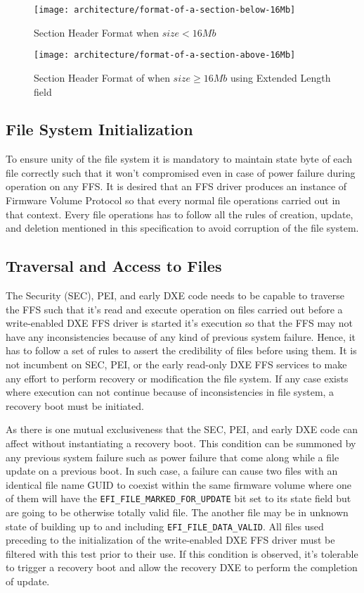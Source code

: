 \begin{figure}[!htbp]
	\centering
	\texttt{[image: architecture/format-of-a-section-below-16Mb]}
	\caption{Section Header Format when $ size < 16Mb $}\label{fig:architecture-format-of-a-section-below-16Mb}
\end{figure}

\begin{figure}[!htbp]
	\centering
	\texttt{[image: architecture/format-of-a-section-above-16Mb]}
	\caption{Section Header Format of when $ size \geq 16Mb $  using Extended Length field}\label{fig:architecture-format-of-a-section-above-16Mb}
\end{figure}


\subsection{File System Initialization}\label{subsection:file-system-initialization}
To ensure unity of the file system it is mandatory to maintain state byte of each file correctly such that it won't compromised even in case of power failure during operation on any FFS. It is desired that an FFS driver produces an instance of Firmware Volume Protocol so that every normal file operations carried out in that context. Every file operations has to follow all the rules of creation, update, and deletion mentioned in this specification to avoid corruption of the file system.

\subsection{Traversal and Access to Files}
The Security (SEC), PEI, and early DXE code needs to be capable to traverse the FFS such that it's read and execute operation on files carried out before a write-enabled DXE FFS driver is started it's execution so that the FFS may not have any inconsistencies because of any kind of previous system failure. Hence, it has to follow a set of rules to assert the credibility of files before using them. It is not incumbent on SEC, PEI, or the early read-only DXE FFS services to make any effort to perform recovery or modification the file system. If any case exists where execution can not continue because of inconsistencies in file system, a recovery boot must be initiated.

As there is one mutual exclusiveness that the SEC, PEI, and early DXE code can affect without instantiating a recovery boot. This condition can be summoned by any previous system failure such as power failure that come along while a file update on a previous boot. In such case, a failure can cause two files with an identical file name GUID to coexist within the same firmware volume where one of them will have the \verb|EFI_FILE_MARKED_FOR_UPDATE| bit set to its state field but are going to be otherwise totally valid file. The another file may be in unknown state of building up to and including \verb|EFI_FILE_DATA_VALID|. All files used preceding to the initialization of the write-enabled DXE FFS driver must be filtered with this test prior to their use. If this condition is observed, it's tolerable to trigger a recovery boot and allow the recovery DXE to perform the completion of update.

